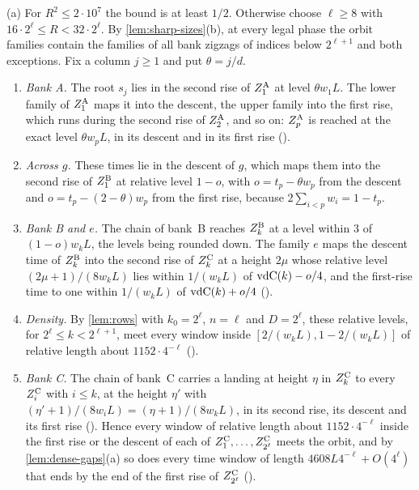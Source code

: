 \begin{outline}
(a) For $R^2\le2\cdot10^7$ the bound is at least $1/2$. Otherwise choose $\ell\ge8$ with
$16\cdot2^\ell\le R<32\cdot2^\ell$. By \cref{lem:sharp-sizes}(b), at every legal phase the
orbit families contain the families of all bank zigzags of indices below $2^{\ell+1}$
and both exceptions. Fix a column $j\ge1$ and put $\theta=j/d$.
\begin{enumerate}[label=(\roman*)]
\item \emph{Bank A.} The root $s_j$ lies in the second rise of $Z^{\mathrm A}_1$ at level
$\theta w_1L$. The lower family of $Z^{\mathrm A}_1$ maps it into the descent, the upper family into
the first rise, which runs during the second rise of $Z^{\mathrm A}_2$, and so on: $Z^{\mathrm A}_p$ is
reached at the exact level $\theta w_pL$, in its descent and in its first rise
().
\item \emph{Across $g$.} These times lie in the descent of $g$, which maps them into the
second rise of $Z^{\mathrm B}_1$ at relative level $1-o$, with $o=t_p-\theta w_p$ from the
descent and $o=t_p-(2-\theta)w_p$ from the first rise, because
$2\sum_{i<p}w_i=1-t_p$.
\item \emph{Bank B and $e$.} The chain of bank~B reaches $Z^{\mathrm B}_k$ at a level within $3$ of
$(1-o)w_kL$, the levels being rounded down. The family $e$ maps the descent time of
$Z^{\mathrm B}_k$ into the second rise of $Z^{\mathrm C}_k$ at a height $2\mu$ whose relative level
$(2\mu+1)/(8w_kL)$ lies within $1/(w_kL)$ of $\mathrm{vdC}(k)-o/4$, and the first-rise time to
one within $1/(w_kL)$ of $\mathrm{vdC}(k)+o/4$ ().
\item \emph{Density.} By \cref{lem:rows} with $k_0=2^\ell$, $n=\ell$ and $D=2^\ell$,
these relative levels, for $2^\ell\le k<2^{\ell+1}$, meet every window inside
$[2/(w_kL),1-2/(w_kL)]$ of relative length about $1152\cdot4^{-\ell}$
().
\item \emph{Bank C.} The chain of bank~C carries a landing at height $\eta$ in $Z^{\mathrm C}_k$ to
every $Z^{\mathrm C}_i$ with $i\le k$, at the height $\eta'$ with
$(\eta'+1)/(8w_iL)=(\eta+1)/(8w_kL)$, in its second rise, its descent and its first rise
(). Hence every window of relative length about
$1152\cdot4^{-\ell}$ inside the first rise or the descent of each of
$Z^{\mathrm C}_1,\dots,Z^{\mathrm C}_{2^\ell}$ meets the orbit, and by \cref{lem:dense-gaps}(a) so does every
time window of length $4608L4^{-\ell}+O(4^\ell)$ that ends by the end of the first rise
of $Z^{\mathrm C}_{2^\ell}$ ().

\end{enumerate}
\end{outline}

